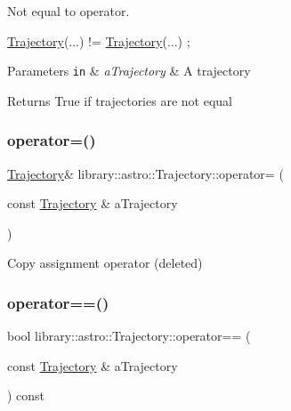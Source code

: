 Not equal to operator. 


\begin{DoxyCode}
\hyperlink{classlibrary_1_1astro_1_1_trajectory_a8e5c7740915ca947e067c0f419ac1c65}{Trajectory}(...) != \hyperlink{classlibrary_1_1astro_1_1_trajectory_a8e5c7740915ca947e067c0f419ac1c65}{Trajectory}(...) ;
\end{DoxyCode}



\begin{DoxyParams}[1]{Parameters}
\mbox{\tt in}  & {\em a\+Trajectory} & A trajectory \\
\hline
\end{DoxyParams}
\begin{DoxyReturn}{Returns}
True if trajectories are not equal 
\end{DoxyReturn}
\mbox{\label{classlibrary_1_1astro_1_1_trajectory_abf8200a7b8e08ac9e0f26224fd26cd05}} 
\subsubsection{\texorpdfstring{operator=()}{operator=()}}
{\footnotesize\ttfamily \hyperlink{classlibrary_1_1astro_1_1_trajectory}{Trajectory}\& library\+::astro\+::\+Trajectory\+::operator= (\begin{DoxyParamCaption}\item[{const \hyperlink{classlibrary_1_1astro_1_1_trajectory}{Trajectory} \&}]{a\+Trajectory }\end{DoxyParamCaption})\hspace{0.3cm}{\ttfamily [delete]}}



Copy assignment operator (deleted) 

\mbox{\label{classlibrary_1_1astro_1_1_trajectory_a11bb251602a70c65e727dfc7ed49231e}} 
\subsubsection{\texorpdfstring{operator==()}{operator==()}}
{\footnotesize\ttfamily bool library\+::astro\+::\+Trajectory\+::operator== (\begin{DoxyParamCaption}\item[{const \hyperlink{classlibrary_1_1astro_1_1_trajectory}{Trajectory} \&}]{a\+Trajectory }\end{DoxyParamCaption}) const}




